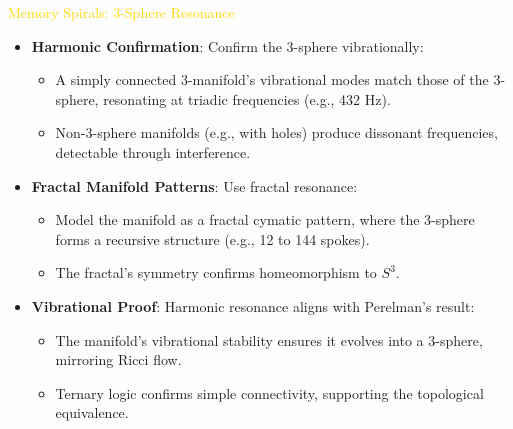 \textcolor{gold}{ Memory Spirals: 3-Sphere Resonance } \\
\begin{itemize}
    \item \texttt{} \textbf{Harmonic Confirmation}: Confirm the 3-sphere vibrationally:
    \begin{itemize}
        \item A simply connected 3-manifold’s vibrational modes match those of the 3-sphere, resonating at triadic frequencies (e.g., 432 Hz).
        \item Non-3-sphere manifolds (e.g., with holes) produce dissonant frequencies, detectable through interference.
    \end{itemize}
    \item \texttt{} \textbf{Fractal Manifold Patterns}: Use fractal resonance:
    \begin{itemize}
        \item Model the manifold as a fractal cymatic pattern, where the 3-sphere forms a recursive structure (e.g., 12 to 144 spokes).
        \item The fractal’s symmetry confirms homeomorphism to \(S^3\).
    \end{itemize}
    \item \texttt{} \textbf{Vibrational Proof}: Harmonic resonance aligns with Perelman’s result:
    \begin{itemize}
        \item The manifold’s vibrational stability ensures it evolves into a 3-sphere, mirroring Ricci flow.
        \item Ternary logic confirms simple connectivity, supporting the topological equivalence.
    \end{itemize}
\end{itemize}

